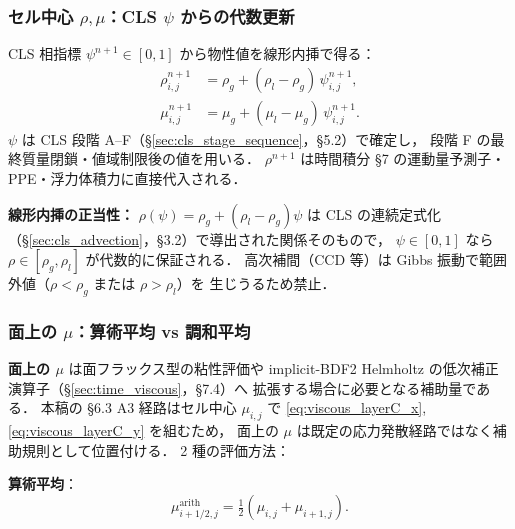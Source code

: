 \subsubsection{\texorpdfstring{セル中心 $\rho, \mu$：CLS $\psi$ からの代数更新}{セル中心 ρ, μ：CLS ψ からの代数更新}}
\label{sec:rho_mu_cell_center}

CLS 相指標 $\psi^{n+1}\in[0,1]$ から物性値を線形内挿で得る：
\begin{align}
  \rho_{i,j}^{n+1} &= \rho_g + (\rho_l - \rho_g)\,\psi_{i,j}^{n+1},
  \label{eq:rho_update}\\
  \mu_{i,j}^{n+1} &= \mu_g + (\mu_l - \mu_g)\,\psi_{i,j}^{n+1}.
  \label{eq:mu_update}
\end{align}
$\psi$ は CLS 段階 A--F（\S\ref{sec:cls_stage_sequence}，§5.2）で確定し，
段階 F の最終質量閉鎖・値域制限後の値を用いる．
$\rho^{n+1}$ は時間積分 §7 の運動量予測子・PPE・浮力体積力に直接代入される．

\noindent\textbf{線形内挿の正当性：}
$\rho(\psi) = \rho_g + (\rho_l-\rho_g)\psi$ は CLS の連続定式化
（\S\ref{sec:cls_advection}，§3.2）で導出された関係そのもので，
$\psi\in[0,1]$ なら $\rho\in[\rho_g,\rho_l]$ が代数的に保証される．
高次補間（CCD 等）は Gibbs 振動で範囲外値（$\rho<\rho_g$ または $\rho>\rho_l$）を
生じうるため禁止．

\subsubsection{\texorpdfstring{面上の $\mu$：算術平均 vs 調和平均}{面上の μ：算術平均 vs 調和平均}}
\label{sec:mu_face_interpolation}

\textbf{面上の $\mu$} は面フラックス型の粘性評価や
implicit-BDF2 Helmholtz の低次補正演算子（§\ref{sec:time_viscous}，§7.4）へ
拡張する場合に必要となる補助量である．
本稿の §6.3 A3 経路はセル中心 $\mu_{i,j}$ で
\eqref{eq:viscous_layerC_x},\eqref{eq:viscous_layerC_y} を組むため，
面上の $\mu$ は既定の応力発散経路ではなく補助規則として位置付ける．
2 種の評価方法：

\noindent\textbf{算術平均}：
\begin{equation}
  \mu_{i+1/2,j}^\text{arith} = \tfrac{1}{2}(\mu_{i,j} + \mu_{i+1,j}).
  \label{eq:mu_face_arith}
\end{equation}

